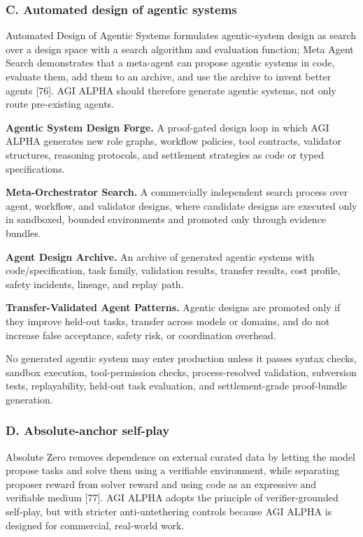 \documentclass[
  11pt,
]{article}
\begin{document}
\subsubsection{C. Automated design of agentic
systems}\label{c.-automated-design-of-agentic-systems}

Automated Design of Agentic Systems formulates agentic-system design as
search over a design space with a search algorithm and evaluation
function; Meta Agent Search demonstrates that a meta-agent can propose
agentic systems in code, evaluate them, add them to an archive, and use
the archive to invent better agents {[}76{]}. AGI ALPHA should therefore
generate agentic systems, not only route pre-existing agents.

\textbf{Agentic System Design Forge.} A proof-gated design loop in which
AGI ALPHA generates new role graphs, workflow policies, tool contracts,
validator structures, reasoning protocols, and settlement strategies as
code or typed specifications.

\textbf{Meta-Orchestrator Search.} A commercially independent search
process over agent, workflow, and validator designs, where candidate
designs are executed only in sandboxed, bounded environments and
promoted only through evidence bundles.

\textbf{Agent Design Archive.} An archive of generated agentic systems
with code/specification, task family, validation results, transfer
results, cost profile, safety incidents, lineage, and replay path.

\textbf{Transfer-Validated Agent Patterns.} Agentic designs are promoted
only if they improve held-out tasks, transfer across models or domains,
and do not increase false acceptance, safety risk, or coordination
overhead.

No generated agentic system may enter production unless it passes syntax
checks, sandbox execution, tool-permission checks, process-resolved
validation, subversion tests, replayability, held-out task evaluation,
and settlement-grade proof-bundle generation.

\subsubsection{D. Absolute-anchor
self-play}\label{d.-absolute-anchor-self-play}

Absolute Zero removes dependence on external curated data by letting the
model propose tasks and solve them using a verifiable environment, while
separating proposer reward from solver reward and using code as an
expressive and verifiable medium {[}77{]}. AGI ALPHA adopts the
principle of verifier-grounded self-play, but with stricter
anti-untethering controls because AGI ALPHA is designed for commercial,
real-world work.
\end{document}

